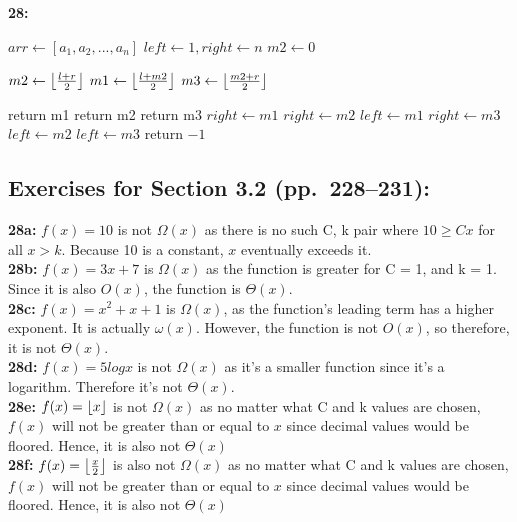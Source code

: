 \documentclass[12pt]{article}  %
\DeclarePairedDelimiter\floor{\lfloor}{\rfloor}
\begin{document}
\noindent
{\bf 28:}
\\
\begin{algorithmic}
      \State $arr \gets [a_{1}, a_{2}, ... , a_{n}]$
      \State $left \gets 1, right \gets n$
      \State $m2 \gets 0$

            \State $m2 \gets \floor*{\frac{l + r}{2}}$
            \State $m1 \gets \floor*{\frac{l + m2}{2}}$
            \State $m3 \gets \floor*{\frac{m2 + r}{2}}$

                  \State return m1
            \EndIf
                  \State return m2
            \EndIf
                  \State return m3
            \EndIf
                  \State $right \gets m1$
            \EndIf
                  \State $right \gets m2$
                  \State $left \gets m1$
            \EndIf
                  \State $right \gets m3$
                  \State $left \gets m2$
            \EndIf
                  \State $left \gets m3$
            \EndIf
      \EndWhile
      \State return $-1$
      

\end{algorithmic}


\subsection*{Exercises for Section 3.2 (pp.\ 228--231):}     

\noindent
{\bf 28a:} $f(x) = 10$ is not $\Omega(x)$ as there is no such C, k pair
where $10 \geq Cx$ for all $x > k$. Because 10 is a constant, $x$ eventually
exceeds it. 
\\
{\bf 28b:} $f(x) = 3x + 7$ is $\Omega(x)$ as the function is greater for
C = 1, and k = 1. Since it is also $O(x)$, the function is $\Theta(x)$.
\\
{\bf 28c:} $f(x) = x^2 + x + 1$ is $\Omega(x)$, as the function's leading
term has a higher exponent. It is actually $\omega(x)$. However, the function
is not $O(x)$, so therefore, it is not $\Theta(x)$.
\\
{\bf 28d:} $f(x) = 5 log x$ is not $\Omega(x)$ as it's a smaller function
since it's a logarithm. Therefore it's not $\Theta(x)$.
\\
{\bf 28e:} $f(x) = \floor*{x}$ is not $\Omega(x)$ as no matter what C and k
values are chosen, $f(x)$ will not be greater than or equal to $x$ since
decimal values would be floored. Hence, it is also not $\Theta(x)$
\\
{\bf 28f:} $f(x) = \floor*{\frac{x}{2}}$ is also not $\Omega(x)$ as no matter what C and k
values are chosen, $f(x)$ will not be greater than or equal to $x$ since
decimal values would be floored. Hence, it is also not $\Theta(x)$
\end{document}
